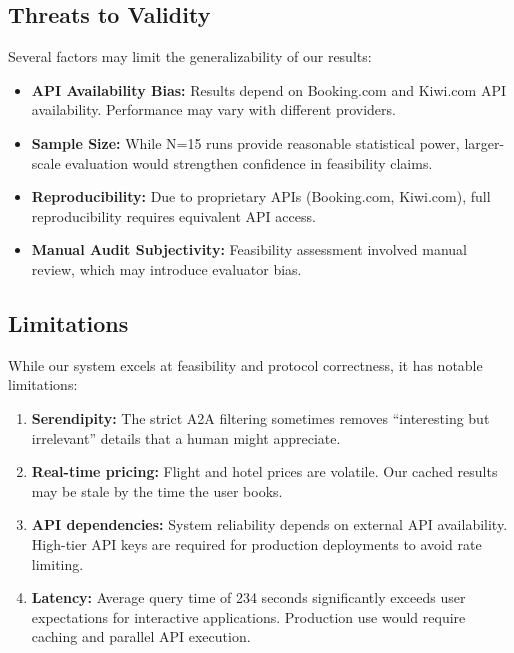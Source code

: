 \documentclass[10pt,twocolumn]{article}
\begin{document}
\subsection{Threats to Validity}
Several factors may limit the generalizability of our results:
\begin{itemize}
    \item \textbf{API Availability Bias:} Results depend on Booking.com and Kiwi.com API availability. Performance may vary with different providers.
    \item \textbf{Sample Size:} While N=15 runs provide reasonable statistical power, larger-scale evaluation would strengthen confidence in feasibility claims.
    \item \textbf{Reproducibility:} Due to proprietary APIs (Booking.com, Kiwi.com), full reproducibility requires equivalent API access.
    \item \textbf{Manual Audit Subjectivity:} Feasibility assessment involved manual review, which may introduce evaluator bias.
\end{itemize}

\subsection{Limitations}
While our system excels at feasibility and protocol correctness, it has notable limitations:

\begin{enumerate}
    \item \textbf{Serendipity:} The strict A2A filtering sometimes removes ``interesting but irrelevant'' details that a human might appreciate.
    \item \textbf{Real-time pricing:} Flight and hotel prices are volatile. Our cached results may be stale by the time the user books.
    \item \textbf{API dependencies:} System reliability depends on external API availability. High-tier API keys are required for production deployments to avoid rate limiting.
    \item \textbf{Latency:} Average query time of 234 seconds significantly exceeds user expectations for interactive applications. Production use would require caching and parallel API execution.
\end{enumerate}
\end{document}
